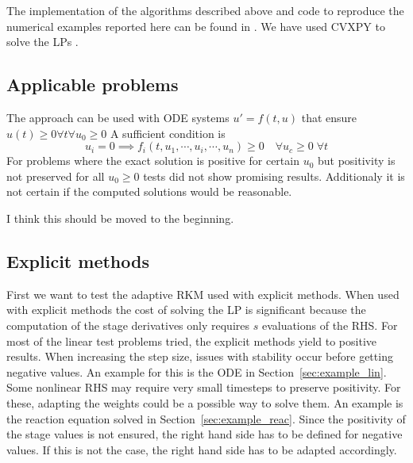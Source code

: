 \documentclass[a4paper]{article}
\numberwithin{equation}{section}
\theoremstyle{plain}
\theoremstyle{definition}
\numberwithin{theorem}{section}
\newcommand{\1}{\mathbbm{1}}
\newcommand{\todo}[1]{{\Large{\color{red}{#1}}}}
\begin{document}
The implementation of the algorithms described above and code to
reproduce the numerical examples reported here can be found in
\cite{repository}. We have used CVXPY to solve the LPs
\cite{cvxpy, cvxpy_rewriting}.
\todo{TODO: Which solver of CVXPY?} %


\subsection{Applicable problems}\label{sec:app_problem}
The approach can be used with ODE systems $u' = f(t,u)$ that ensure  $u(t) \geq 0 \forall t \forall {  u_0 \geq 0}$ 
A sufficient condition is  
\begin{equation}
u_i=0 \implies f_i(t,u_1,\cdots,u_i,\cdots,u_n) \geq 0 \quad \forall {u_c \geq 0}\; \forall {t}
\end{equation}
For problems where the exact solution is positive for certain $u_0$ but positivity is not preserved for all $u_0 \geq 0$ tests did not show promising results. Additionaly it is not certain if the computed solutions would be reasonable.

\todo{Note (HR)} I think this should be moved to the beginning.


\subsection{Explicit methods}\label{sec:Ex_expl}
First we want to test the adaptive RKM used with explicit methods.  
When used with explicit methods the cost of solving the LP is significant because the computation of the stage derivatives only requires $s$ evaluations of the RHS.
For most of the linear test problems tried, the explicit methods yield to positive results.  
When increasing the step size, issues with stability occur before getting negative values.  
An example for this is the ODE in Section~\ref{sec:example_lin}.
Some nonlinear RHS may require very small timesteps to preserve positivity.  
For these, adapting the weights could be a possible way to solve them. 
An example is the reaction equation solved in Section~\ref{sec:example_reac}.
Since the positivity of the stage values is not ensured, the right hand side has to be defined for negative values. If this is not the case, the right hand side has to be adapted accordingly.
\end{document}
